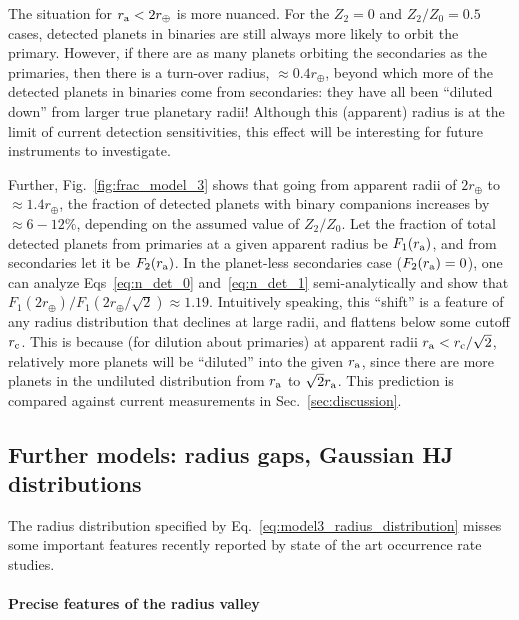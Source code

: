 \documentclass[12pt,modern]{aastex61}
\renewcommand{\a}{_{\rm a}}
\begin{document}
The situation for $r\a < 2r_\oplus$ is more nuanced.
For the $Z_2=0$ and $Z_2/Z_0=0.5$ cases, detected planets in binaries are 
still always more likely to orbit the primary.
However, if there are as many planets orbiting the secondaries as the 
primaries, then there is a turn-over radius, $\approx 0.4r_\oplus$, 
beyond which more of the detected planets in binaries come from secondaries: 
they have all been ``diluted down'' from larger true planetary radii!
Although this (apparent) radius is at the limit of current detection 
sensitivities, this effect will be interesting for future instruments to 
investigate.

Further, Fig.~\ref{fig:frac_model_3} shows that going from apparent 
radii of $2r_\oplus$ to $\approx 1.4r_\oplus$, the fraction of detected 
planets with binary companions increases by $\approx 6-12\%$, depending on the 
assumed value of $Z_2/Z_0$.
Let the fraction of total detected planets from primaries at a given 
apparent radius be $F_1(r\a)$, and from secondaries let it be $F_2(r\a)$.
In the planet-less secondaries case ($F_2(r\a)=0$), one can 
analyze Eqs~\ref{eq:n_det_0} and~\ref{eq:n_det_1} semi-analytically and show 
that $F_1(2r_\oplus)/F_1(2r_\oplus/\sqrt{2}) \approx 1.19$.
Intuitively speaking, this ``shift'' is a feature of any radius distribution 
that declines at large radii, and flattens below some cutoff $r_{\rm c}$.
This is because (for dilution about primaries)
at apparent radii $r\a < r_{\rm c}/\sqrt{2}$, relatively more planets will be 
``diluted'' into the given $r\a$, since there are more planets in 
the undiluted distribution from $r\a$ to $\sqrt{2}r\a$.
This prediction is compared against current measurements in 
Sec.~\ref{sec:discussion}.



\subsection{Further models: radius gaps, Gaussian HJ distributions}
\label{sec:further_models}

The radius distribution specified by Eq.~\ref{eq:model3_radius_distribution} 
misses some important features recently reported by state of the art 
occurrence rate studies.

\paragraph{Precise features of the radius valley}
\end{document}
